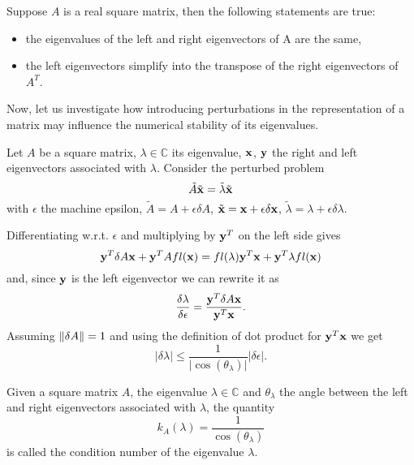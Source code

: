 \begin{remark}
    Suppose \(A\) is a real square matrix, then the following statements are true:
    \begin{itemize}[topsep=0pt, itemsep=0pt, parsep=0pt]
        \item the eigenvalues of the left and right eigenvectors of A are the same,
        \item the left eigenvectors simplify into the transpose of the right eigenvectors of \(A^T\).
    \end{itemize}
\end{remark}

Now, let us investigate how introducing perturbations in the representation of a matrix may influence the numerical stability of its
eigenvalues.

Let \(A\) be a square matrix, \(\lambda \in \mathbb{C}\) its eigenvalue, \(\vb{x}\), \(\vb{y}\) the right
and left eigenvectors associated with \(\lambda\). Consider the perturbed problem
\[
    \tilde{A} \tilde{\vb{x}} = \tilde{\lambda} \tilde{\vb{x}}
\]
with \(\epsilon\) the machine epsilon, \(\tilde{A} = A + \epsilon\delta A\), \(\tilde{\vb{x}} = \vb{x} +
\epsilon\delta \vb{x}\), \(\tilde{\lambda} = \lambda + \epsilon\delta \lambda\).

Differentiating w.r.t. \(\epsilon\) and multiplying by \(\vb{y}^T\) on the left side gives
\[
    \vb{y}^T \delta A \vb{x} + \vb{y}^T A fl(\vb{x}) = fl(\lambda) \vb{y}^T \vb{x} + \vb{y}^T \lambda fl(\vb{x})
\]
and, since \(\vb{y}\) is the left eigenvector we can rewrite it as
\[
    \dfrac{\delta \lambda}{\delta \epsilon} = \dfrac{\vb{y}^T \delta A \vb{x}}{\vb{y}^T \vb{x}}.
\]
Assuming \(\norm{\delta A} = 1\) and using the definition of dot product for \(\vb{y}^T \vb{x}\) we get
\[
    \vert \delta \lambda \vert \leq \dfrac{1}{\vert \cos(\theta_{\lambda}) \vert} \vert \delta \epsilon \vert.
\]

\begin{definition}\cite{stewart1990matrix}
    Given a square matrix \(A\), the eigenvalue \(\lambda \in \mathbb{C}\) and \(\theta_{\lambda}\) the angle between the left
    and right eigenvectors associated with \(\lambda\), the quantity
    \[k_{A}(\lambda) = \dfrac{1}{\cos(\theta_{\lambda})}\]
    is called the condition number of the eigenvalue \(\lambda\).
\end{definition}
    
